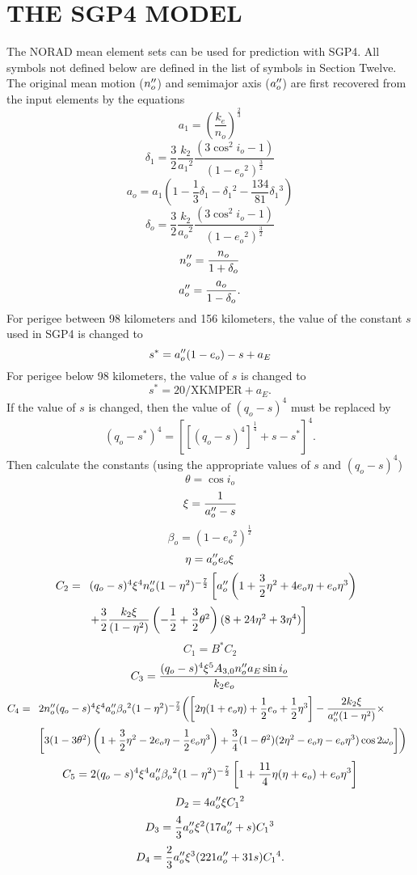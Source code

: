 \section[The SGP4 Model]{THE SGP4 MODEL}
The NORAD mean element sets can be used for prediction with SGP4.  All
symbols not defined below are defined in the list of symbols in Section
Twelve.  The original mean motion ($n''_o$) and semimajor axis ($a''_o$) are
first recovered from the input elements by the equations
\[a_1=\left(\dfrac{k_e}{n_o}\right)^{\frac23}\]
\[\delta_1=\dfrac32\dfrac{k_2}{a_1{}^2}\dfrac{(3\cos^2i_o-1)}
{(1-e_o{}^2)^{\frac32}}\]
\[a_o=a_1\left(1-\dfrac13\delta_1-\delta_1{}^2
-\dfrac{134}{81}\delta_1{}^3\right)\]
\[\delta_o=\dfrac32\dfrac{k_2}{a_o{}^2}\dfrac{(3\cos^2i_o-1)}
{(1-e_o{}^2)^{\frac32}}\]
\[n''_o={\displaystyle{n_o\over1+\delta_o}}\]
\[a''_o={\displaystyle{a_o\over1-\delta_o}}.\]
For perigee between 98 kilometers and 156 kilometers, the value of the
constant $s$ used in SGP4 is changed to
\[s^*=a''_o(1-e_o)-s+a_E\]
For perigee below 98 kilometers, the value of $s$ is changed to
\[s^*=20/\mbox{XKMPER}+a_E.\]
If the value of $s$ is changed, then the value of $(q_o-s)^4$ must be replaced
by
\[(q_o-s^*)^4=\left[[(q_o-s)^4]^{\frac14}+s-s^*\right]^4.\]
Then calculate the constants (using the appropriate values of $s$ and
$(q_o-s)^4$)
\[\theta=\cos i_o\]
\[\xi={\displaystyle{1\over a''_o-s}}\]
\[\beta_o=(1-e_o{}^2)^{\frac12}\]
\[\eta=a''_o e_o\xi\]
\[C_2=\begin{array}[t]{l}(q_o-s)^4\xi^4n''_o(1-\eta^2)^{-\frac72}
\left[a''_o\left(1+{\displaystyle{3\over2}}\eta^2+4e_o\eta+e_o\eta^3\right)\right.\\[12pt]
\left.+{\displaystyle{3\over2}}{\displaystyle{k_2\xi\over(1-\eta^2)}}
\left(-{\displaystyle{1\over2}}+{\displaystyle{3\over2}}\theta^2\right)(8+24\eta^2+3\eta^4)\right]
\end{array}\]
\[C_1=B^*C_2\]
\[C_3={\displaystyle{(q_o-s)^4\xi^5A_{3,0}n''_oa_E\sin i_o\over k_2e_o}}\]
\[C_4=\begin{array}[t]{l}2n''_o(q_o-s)^4\xi^4a''_o\beta_o{}^2(1-\eta^2)^{-\frac72}
\biggl(\left[2\eta(1+e_o\eta)
+{\displaystyle{1\over2}}e_o+{\displaystyle{1\over2}}\eta^3\right]-{\displaystyle{2k_2\xi\over a''_o(1-\eta^2)}}\times\\[12pt]
\left[3(1-3\theta^2)
\left(1+{\displaystyle{3\over2}}\eta^2-2e_o\eta-{\displaystyle{1\over2}}e_o\eta^3\right)
+{\displaystyle{3\over4}}(1-\theta^2)(2\eta^2-e_o\eta-e_o\eta^3)\cos 2\omega_o\right]\biggr)
\end{array}\]
\[C_5=2(q_o-s)^4\xi^4a''_o\beta_o{}^2(1-\eta^2)^{-\frac72}
\left[1+{\displaystyle{11\over4}}\eta(\eta+e_o)+e_o\eta^3\right]\]
\[D_2=4a''_o\xi C_1{}^2\]
\[D_3={\displaystyle{4\over3}}a''_o\xi^2(17a''_o+s)C_1{}^3\]
\[D_4={\displaystyle{2\over3}}a''_o\xi^3(221a''_o+31s)C_1{}^4.\]

